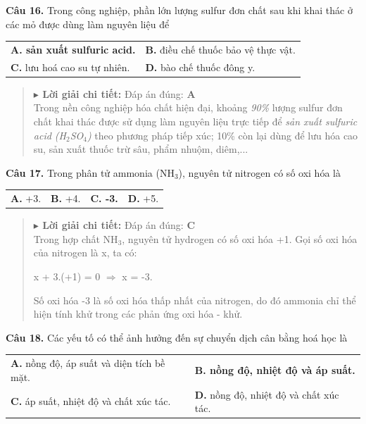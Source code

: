 \documentclass[11pt,a4paper]{article}
\begin{document}
\textbf{Câu 16.} Trong công nghiệp, phần lớn lượng sulfur đơn chất sau khi khai thác ở các mỏ được dùng làm nguyên liệu để

\begin{tabularx}{\textwidth}{@{}XX@{}}
\textbf{\color{red} A. sản xuất sulfuric acid.} & \textbf{B.} điều chế thuốc bảo vệ thực vật. \\
\textbf{C.} lưu hoá cao su tự nhiên. & \textbf{D.} bào chế thuốc đông y. \\
\end{tabularx}

\begin{quote}\small
{\color{myBlue}\textbf{$\blacktriangleright$ Lời giải chi tiết:}} Đáp án đúng: \textbf{\color{red} A}\\
Trong nền công nghiệp hóa chất hiện đại, khoảng \textit{90\%} lượng sulfur đơn chất khai thác được sử dụng làm nguyên liệu trực tiếp để \textit{sản xuất sulfuric acid (H$_{2}$SO$_{4}$)} theo phương pháp tiếp xúc; 10\% còn lại dùng để lưu hóa cao su, sản xuất thuốc trừ sâu, phẩm nhuộm, diêm,...
\end{quote}
\vspace{2pt}

\textbf{Câu 17.} Trong phân tử ammonia (NH$_{3}$), nguyên tử nitrogen có số oxi hóa là

\begin{tabularx}{\textwidth}{@{}XXXX@{}}
\textbf{A.} +3. & \textbf{B.} +4. & \textbf{\color{red} C. -3.} & \textbf{D.} +5. \\
\end{tabularx}

\begin{quote}\small
{\color{myBlue}\textbf{$\blacktriangleright$ Lời giải chi tiết:}} Đáp án đúng: \textbf{\color{red} C}\\
Trong hợp chất NH$_{3}$, nguyên tử hydrogen có số oxi hóa +1. Gọi số oxi hóa của nitrogen là x, ta có:

x + 3.(+1) = 0 $\Rightarrow$ x = -3.

Số oxi hóa -3 là số oxi hóa thấp nhất của nitrogen, do đó ammonia chỉ thể hiện tính khử trong các phản ứng oxi hóa - khử.
\end{quote}
\vspace{2pt}

\textbf{Câu 18.} Các yếu tố có thể ảnh hưởng đến sự chuyển dịch cân bằng hoá học là

\begin{tabularx}{\textwidth}{@{}XX@{}}
\textbf{A.} nồng độ, áp suất và diện tích bề mặt. & \textbf{\color{red} B. nồng độ, nhiệt độ và áp suất.} \\
\textbf{C.} áp suất, nhiệt độ và chất xúc tác. & \textbf{D.} nồng độ, nhiệt độ và chất xúc tác. \\
\end{tabularx}
\end{document}
